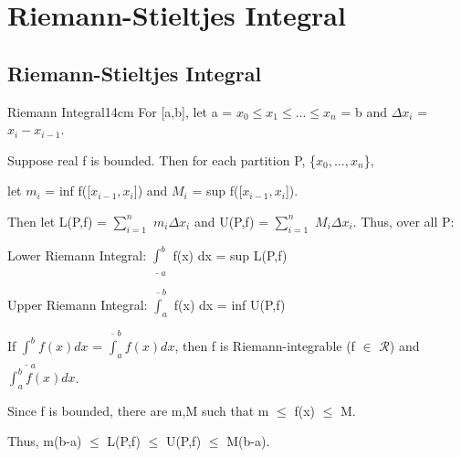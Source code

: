 \newpage
\section[Day 13: Riemann-Stieltjes Integral]{ Riemann-Stieltjes Integral }

\subsection{ Riemann-Stieltjes Integral }

    \begin{definition}{Riemann Integral}{14cm}
        For [a,b], let a = $x_0 \leq x_1 \leq ... \leq x_n$ = b
        and $\Delta x_i$ = $x_i - x_{i-1}$.

        Suppose real f is bounded.
        Then for each partition P, \{$x_0 , ... , x_n$\},

        let $m_i$ = inf f([$x_{i-1},x_i$]) and $M_i$ = sup f([$x_{i-1},x_i$]).
        
        Then let L(P,f) = $\sum_{i=1}^n$ $m_i \Delta x_i$
        and U(P,f) = $\sum_{i=1}^n$ $M_i \Delta x_i$. Thus, over all P:

        \hspace{0.5cm}
        Lower Riemann Integral:
        $\underline{\int}_a^b$ f(x) dx = sup L(P,f)

        \hspace{0.5cm}
        Upper Riemann Integral:
        $\overline{\int}_a^b$ f(x) dx = inf U(P,f)

        \vspace{0.2cm}

        If $\underline{\int}_a^b f(x) dx$ = $\overline{\int}_a^b f(x) dx$, then
        f is Riemann-integrable (f $\in$ $\mathscr{R}$) and $\int_a^b f(x) dx$.
        
        \vspace{0.2cm}

        Since f is bounded, there are m,M such that m $\leq$ f(x) $\leq$ M.

        Thus, m(b-a) $\leq$ L(P,f) $\leq$ U(P,f) $\leq$ M(b-a).
    \end{definition}



